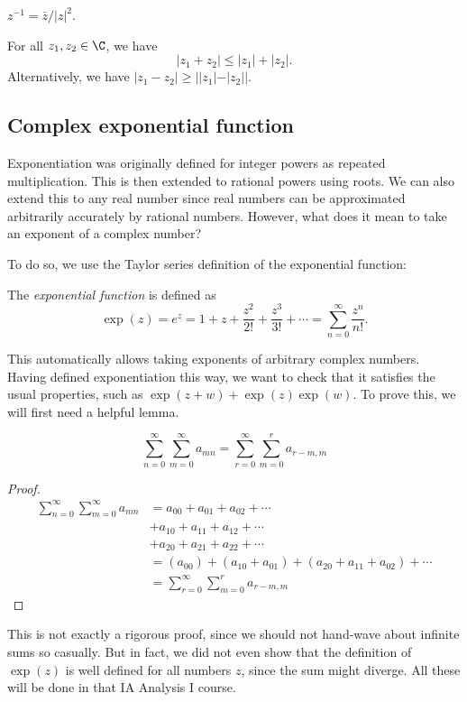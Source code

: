 \documentclass[a4paper]{article}
\begin{document}
\begin{prop}
  $z^{-1} = \bar{z}/|z|^2$.
\end{prop}

\begin{thm}
  For all $z_1, z_2 \in \C$, we have
  \[
    |z_1 + z_2| \leq |z_1| + |z_2|.
  \]
  Alternatively, we have $|z_1 - z_2|\geq ||z_1| - |z_2||$.
\end{thm}

\subsection{Complex exponential function}
Exponentiation was originally defined for integer powers as repeated multiplication. This is then extended to rational powers using roots. We can also extend this to any real number since real numbers can be approximated arbitrarily accurately by rational numbers. However, what does it mean to take an exponent of a complex number?

To do so, we use the Taylor series definition of the exponential function:
\begin{defi}
  The \emph{exponential function} is defined as
  \[
    \exp (z) = e^z = 1 + z + \frac{z^2}{2!} + \frac{z^3}{3!} + \cdots = \sum_{n = 0}^\infty \frac{z^n}{n!}.
  \]
\end{defi}
This automatically allows taking exponents of arbitrary complex numbers. Having defined exponentiation this way, we want to check that it satisfies the usual properties, such as $\exp(z + w) + \exp(z)\exp(w)$. To prove this, we will first need a helpful lemma.

\begin{lemma}
  \[
    \sum_{n = 0}^\infty\sum_{m = 0}^\infty a_{mn} = \sum_{r = 0}^\infty\sum_{m = 0}^r a_{r - m, m}
  \]
\end{lemma}

\begin{proof}
  \begin{align*}
    \sum_{n = 0}^\infty\sum_{m = 0}^\infty a_{mn} &= a_{00} + a_{01} + a_{02} + \cdots\\
    &+ a_{10} + a_{11} + a_{12} + \cdots\\
    &+ a_{20} + a_{21} + a_{22} + \cdots\\
    &= (a_{00}) + (a_{10} + a_{01}) + (a_{20} + a_{11} + a_{02}) + \cdots\\
    &= \sum_{r = 0}^\infty\sum_{m = 0}^r a_{r - m, m}
  \end{align*}
\end{proof}
This is not exactly a rigorous proof, since we should not hand-wave about infinite sums so casually. But in fact, we did not even show that the definition of $\exp(z)$ is well defined for all numbers $z$, since the sum might diverge. All these will be done in that IA Analysis I course.
\end{document}
